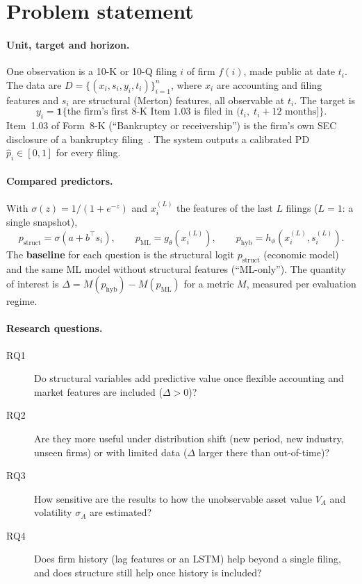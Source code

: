 \section{Problem statement}
\label{sec:problem}

\paragraph{Unit, target and horizon.} One observation is a 10-K or 10-Q filing $i$ of firm $f(i)$, made
public at date $t_i$. The data are $D=\{(x_i, s_i, y_i, t_i)\}_{i=1}^{n}$, where $x_i$ are accounting and
filing features and $s_i$ are structural (Merton) features, all observable at $t_i$. The target is
\begin{equation}
  y_i = \mathbf{1}\{\mbox{the firm's first 8-K Item 1.03 is filed in } (t_i,\; t_i + 12 \mbox{ months}]\}.
  \label{eq:target}
\end{equation}
Item~1.03 of Form~8-K (``Bankruptcy or receivership'') is the firm's own SEC disclosure of a bankruptcy
filing~\cite{sec8k}. The system outputs a calibrated PD $\hat p_i \in [0,1]$ for every filing.

\paragraph{Compared predictors.} With $\sigma(z)=1/(1+e^{-z})$ and $x_i^{(L)}$ the features of the last $L$ filings
($L=1$: a single snapshot),
\begin{equation}
  p_{\mathrm{struct}} = \sigma\left(a + b^{\top} s_i\right), \qquad
  p_{\mathrm{ML}} = g_{\theta}\left(x_i^{(L)}\right), \qquad
  p_{\mathrm{hyb}} = h_{\phi}\left(x_i^{(L)}, s_i^{(L)}\right).
  \label{eq:predictors}
\end{equation}
The \textbf{baseline} for each question is the structural logit $p_{\mathrm{struct}}$ (economic model) and
the same ML model without structural features (``ML-only''). The quantity of interest is
$\Delta = M(p_{\mathrm{hyb}}) - M(p_{\mathrm{ML}})$ for a metric $M$, measured per evaluation regime.

\paragraph{Research questions.}
\begin{description}
  \item[RQ1] Do structural variables add predictive value once flexible accounting and market features are included ($\Delta>0$)?
  \item[RQ2] Are they more useful under distribution shift (new period, new industry, unseen firms) or with limited data ($\Delta$ larger there than out-of-time)?
  \item[RQ3] How sensitive are the results to how the unobservable asset value $V_A$ and volatility $\sigma_A$ are estimated?
  \item[RQ4] Does firm history (lag features or an LSTM) help beyond a single filing, and does structure still help once history is included?
\end{description}

